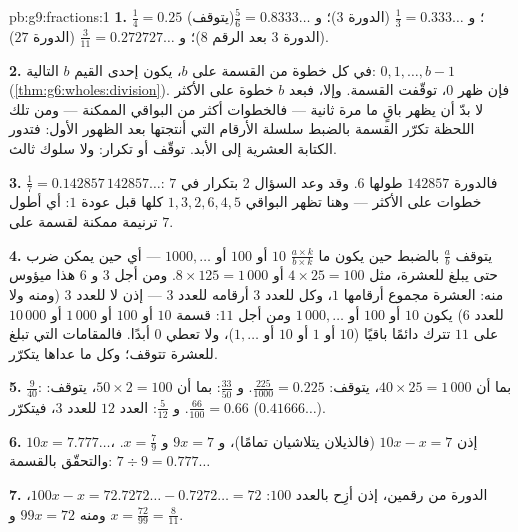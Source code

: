 \begin{solution}{pb:g9:fractions:1}
\textbf{1.} $\frac14 = 0.25$ (يتوقف)؛ و $\frac13 = 0.333\ldots$
(الدورة $3$)؛ و $\frac56 = 0.8333\ldots$ (الدورة $3$ بعد
الرقم $8$)؛ و $\frac{3}{11} = 0.272727\ldots$ (الدورة $27$).

\textbf{2.} في كل خطوة من القسمة على $b$، يكون 
إحدى القيم $b$ التالية: $0, 1, \dots, b - 1$
(\cref{thm:g6:wholes:division}). فإن ظهر  $0$، توقّفت
القسمة. وإلا، فبعد $b$ خطوة على الأكثر لا بدّ أن يظهر
باقٍ ما مرة ثانية --- فالخطوات أكثر
من البواقي الممكنة --- ومن تلك اللحظة تكرّر القسمة
بالضبط سلسلة الأرقام التي أنتجتها بعد
الظهور الأول: فتدور الكتابة العشرية إلى الأبد. توقّف أو
تكرار: ولا سلوك ثالث.

\textbf{3.} $\frac17 = 0.142857\,142857\ldots$: فالدورة
$142857$ طولها $6$. وقد وعد السؤال 2 بتكرار في
$7$ خطوات على الأكثر --- وهنا تظهر البواقي
$1, 3, 2, 6, 4, 5$ كلها قبل عودة $1$: أي
أطول ترنيمة ممكنة لقسمة على $7$.

\textbf{4.} يتوقف $\frac ab$ بالضبط حين يكون  ما
$\frac{a \times k}{b \times k}$  $10$ أو $100$ أو
$1000, \dots$ --- أي حين يمكن ضرب 
حتى يبلغ  للعشرة، مثل $4 \times 25 = 100$ أو
$8 \times 125 = 1\,000$. ومن أجل $3$ و $6$ هذا ميؤوس منه: 
العشرة مجموع أرقامها $1$، وكل  للعدد $3$ 
أرقامه  للعدد $3$ --- إذن لا  للعدد $3$
(ومنه ولا للعدد $6$) يكون $10$ أو $100$ أو $1\,000, \dots$ ومن أجل
$11$: قسمة $10$ أو $100$ أو $1\,000$ أو $10\,000$ على $11$ تترك دائمًا
باقيًا ($10$ أو $1$ أو $10$ أو $1, \dots$)، ولا تعطي $0$ أبدًا.
فالمقامات التي تبلغ  للعشرة تتوقف؛ وكل ما عداها يتكرّر.

\textbf{5.} $\frac{9}{40}$: بما أن $40 \times 25 = 1\,000$، يتوقف:
$\frac{225}{1000} = 0.225$. و $\frac{33}{50}$:
بما أن $50 \times 2 = 100$، يتوقف: $\frac{66}{100} = 0.66$.
و $\frac{5}{12}$: العدد $12$  للعدد $3$، فيتكرّر
($0.41666\ldots$).

\textbf{6.} $10x = 7.777\ldots$، إذن $10x - x = 7$ (فالذيلان
يتلاشيان تمامًا)، و $9x = 7$ و $x = \frac79$. والتحقّق بالقسمة:
$7 \div 9 = 0.777\ldots$

\textbf{7.} الدورة من رقمين، إذن أزِح بالعدد $100$:
$100x - x = 72.7272\ldots - 0.7272\ldots = 72$، ومنه
$99x = 72$ و $x = \frac{72}{99} = \frac{8}{11}$.


\end{solution}
